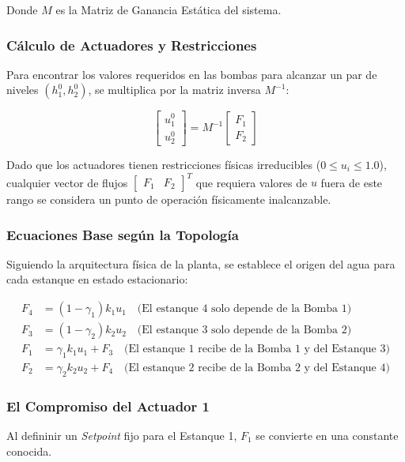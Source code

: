 Donde $M$ es la Matriz de Ganancia Estática del sistema.

\subsubsection{Cálculo de Actuadores y Restricciones}
Para encontrar los valores requeridos en las bombas para alcanzar un par de niveles $(h_1^0, h_2^0)$, se multiplica por la matriz inversa $M^{-1}$:

\begin{equation}
\begin{bmatrix} u_1^0 \\ u_2^0 \end{bmatrix} = M^{-1} \begin{bmatrix} F_1 \\ F_2 \end{bmatrix}
\label{eq:calculo_bombas}
\end{equation}

Dado que los actuadores tienen restricciones físicas irreducibles ($0 \le u_i \le 1.0$), cualquier vector de flujos $\begin{bmatrix} F_1 & F_2 \end{bmatrix}^T$ que requiera valores de $u$ fuera de este rango se considera un punto de operación físicamente inalcanzable.


\subsubsection{Ecuaciones Base según la Topología}
Siguiendo la arquitectura física de la planta, se establece el origen del agua para cada estanque en estado estacionario:

\begin{align}
F_4 &= (1-\gamma_1) k_1 u_1 \quad \text{(El estanque 4 solo depende de la Bomba 1)} \label{eq:F4_u1} \\
F_3 &= (1-\gamma_2) k_2 u_2 \quad \text{(El estanque 3 solo depende de la Bomba 2)} \label{eq:F3_u2} \\
F_1 &= \gamma_1 k_1 u_1 + F_3 \quad \text{(El estanque 1 recibe de la Bomba 1 y del Estanque 3)} \label{eq:F1_dependencia} \\
F_2 &= \gamma_2 k_2 u_2 + F_4 \quad \text{(El estanque 2 recibe de la Bomba 2 y del Estanque 4)} \label{eq:F2_dependencia}
\end{align}

\subsubsection{El Compromiso del Actuador 1}
Al defininir un \textit{Setpoint} fijo para el Estanque 1, $F_1$ se convierte en una constante conocida. 

